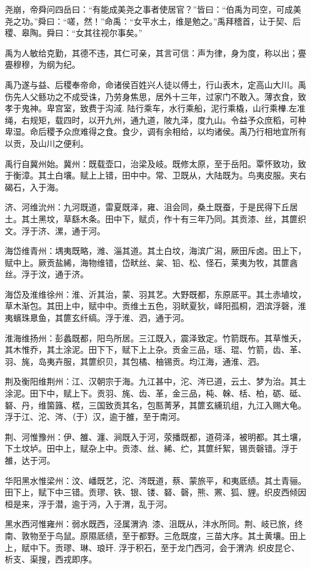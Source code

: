 \documentclass[UTF8,12pt,AutoFakeBold]{ctexart}
\begin{document}
尧崩，帝舜问四岳曰：“有能成美尧之事者使居官？”皆曰：“伯禹为司空，可成美尧之功。”舜曰：“嗟，然！”命禹：“女平水土，维是勉之。”禹拜稽首，让于契、后稷、皋陶。舜曰：“女其往视尔事矣。”

禹为人敏给克勤，其德不违，其仁可亲，其言可信：声为律，身为度，称以出；亹亹穆穆，为纲为纪。

禹乃遂与益、后稷奉帝命，命诸侯百姓兴人徒以傅土，行山表木，定高山大川。禹伤先人父鲧功之不成受诛，乃劳身焦思，居外十三年，过家门不敢入。薄衣食，致孝于鬼神。卑宫室，致费于沟淢. 陆行乘车，水行乘船，泥行乘橇，山行乘檋.左准绳，右规矩，载四时，以开九州，通九道，陂九泽，度九山。令益予众庶稻，可种卑湿。命后稷予众庶难得之食。食少，调有余相给，以均诸侯。禹乃行相地宜所有以贡，及山川之便利。

禹行自冀州始。冀州：既载壶口，治梁及岐。既修太原，至于岳阳。覃怀致功，致于衡漳。其土白壤。赋上上错，田中中。常、卫既从，大陆既为。鸟夷皮服。夹右碣石，入于海。

济、河维沇州：九河既道，雷夏既泽，雍、沮会同，桑土既蚕，于是民得下丘居土。其土黑坟，草繇木条。田中下，赋贞，作十有三年乃同。其贡漆、丝，其篚织文。浮于济、漯，通于河。

海岱维青州：堣夷既略，潍、淄其道。其土白坟，海滨广潟，厥田斥卤。田上下，赋中上。厥贡盐絺，海物维错，岱畎丝、枲、铅、松、怪石，莱夷为牧，其篚酓丝。浮于汶，通于济。

海岱及淮维徐州：淮、沂其治，蒙、羽其艺。大野既都，东原厎平。其土赤埴坟，草木渐包。其田上中，赋中中。贡维土五色，羽畎夏狄，峄阳孤桐，泗滨浮磬，淮夷蠙珠臮鱼，其篚玄纤缟。浮于淮、泗，通于河。

淮海维扬州：彭蠡既都，阳鸟所居。三江既入，震泽致定。竹箭既布。其草惟夭，其木惟乔，其土涂泥。田下下，赋下上上杂。贡金三品，瑶、琨、竹箭，齿、革、羽、旄，岛夷卉服，其篚织贝，其包橘、柚锡贡。均江海，通淮、泗。

荆及衡阳维荆州：江、汉朝宗于海。九江甚中，沱、涔已道，云土、梦为治。其土涂泥。田下中，赋上下。贡羽、旄、齿、革，金三品，杶、榦、栝、柏，砺、砥、砮、丹，维箘簬、楛，三国致贡其名，包匦菁茅，其篚玄纁玑组，九江入赐大龟。浮于江、沱、涔、（于）汉，逾于雒，至于南河。

荆、河惟豫州：伊、雒、瀍、涧既入于河，荥播既都，道荷泽，被明都。其土壤，下土坟垆。田中上，赋杂上中。贡漆、丝、絺、纻，其篚纤絮，锡贡磬错。浮于雒，达于河。

华阳黑水惟梁州：汶、嶓既艺，沱、涔既道，蔡、蒙旅平，和夷厎绩。其土青骊。田下上，赋下中三错。贡璆、铁、银、镂、砮、磬，熊、罴、狐、貍。织皮西倾因桓是来，浮于潜，逾于沔，入于渭，乱于河。

黑水西河惟雍州：弱水既西，泾属渭汭. 漆、沮既从，沣水所同。荆、岐已旅，终南、敦物至于鸟鼠。原隰厎绩，至于都野。三危既度，三苗大序。其土黄壤。田上上，赋中下。贡璆、琳、琅玕. 浮于积石，至于龙门西河，会于渭汭. 织皮昆仑、析支、渠搜，西戎即序。
\end{document}
